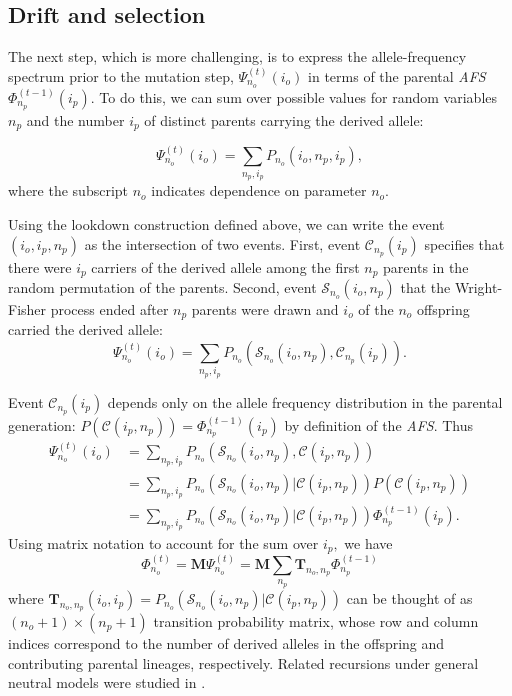 \documentclass[9pt,twocolumn,twoside,lineno]{gsajnl}
\newcommand{\afs}[2]{\Phi_{#1}^{(#2)}}
\newcommand{\afsPsi}[2]{\Psi_{#1}^{(#2)}}
\begin{document}
\subsection{Drift and selection}

The next step, which is more challenging, is to express the allele-frequency spectrum prior to the mutation step, $\afsPsi{n_o}{t}(i_o)$  in terms of the parental
\textit{AFS}  $\afs{n_p}{t-1}(i_p).$ To do this, we can sum over possible values for random variables $n_p$ and the number $i_p$ of distinct parents carrying the derived allele:

\begin{equation}
  \afsPsi{n_o}{t}(i_o)=\sum_{n_p,i_p} P_{n_o}(i_o, n_p, i_p ),
\end{equation}
where the subscript $n_o$ indicates dependence on parameter $n_o$. 

Using the lookdown construction defined above, we can write the event $(i_o,i_p, n_p)$ as the intersection of two events. 
First, event $\mathcal{C}_{n_p}(i_p)$ specifies that there were $i_p$ carriers of the derived allele among the first $n_p$ parents in the random permutation of the parents. Second, 
event $\mathcal{S}_{n_o}(i_o, n_p)$ that the Wright-Fisher process ended after $n_p$ parents were drawn and $i_o$ of the $n_o$ offspring carried the derived allele:    
\begin{equation}
  \afsPsi{n_o}{t}(i_o)=\sum_{n_p,i_p} P_{n_o}(\mathcal{S}_{n_o}(i_o, n_p), \mathcal{C}_{n_p}(i_p) ).
\end{equation}



Event $\mathcal{C}_{n_p}(i_p)$ depends only on the allele frequency distribution in the parental generation: $P(\mathcal{C}(i_p,n_p)) =\afs{n_p}{t-1} (i_p)$ by definition of the \textit{AFS}. Thus
\begin{equation}
  \begin{split}
    \afsPsi{n_o}{t}(i_o)&= \sum_{n_p,i_p} P_{n_o}(\mathcal{S}_{n_o}(i_o, n_p), \mathcal{C}(i_p,n_p) )\\
    &=   \sum_{n_p,i_p} P_{n_o}(\mathcal{S}_{n_o}(i_o, n_p)| \mathcal{C}(i_p,n_p) ) P(\mathcal{C}(i_p,n_p))\\
    &=   \sum_{n_p,i_p} P_{n_o}(\mathcal{S}_{n_o}(i_o, n_p)| \mathcal{C}(i_p,n_p) )  \afs{n_p}{t-1}(i_p).%
  \end{split}
\end{equation}
Using matrix notation to account for the sum over $i_p,$ we have
\begin{equation}
  \afs{n_o}{t} = \mathbf{M}  \afsPsi{n_o}{t} =  \mathbf{M}  \sum_{n_p}  \mathbf{T}_{n_o,n_p}     \afs{n_p}{t-1}
    \label{eq_recur}
  \end{equation}
where $\mathbf{T}_{n_o,n_p}(i_o,i_p) = P_{n_o}(\mathcal{S}_{n_o}(i_o, n_p)| \mathcal{C}(i_p,n_p) ) $ 
can be thought of as $(n_o+1) \times (n_p+1)$ transition
probability matrix, whose row and column indices correspond to the number of derived alleles in the
offspring and contributing parental lineages, respectively. Related recursions under general neutral 
models were studied in \cite{Lessard2010}.
\end{document}
